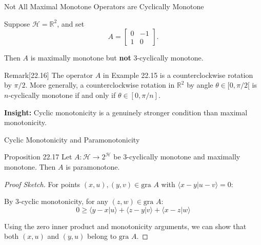 \documentclass[aspectratio=169,10pt]{beamer}
\begin{document}
\begin{frame}{Not All Maximal Monotone Operators are Cyclically Monotone}
    \begin{example}[22.15]
        Suppose $\mathcal{H} = \mathbb{R}^2$, and set
        $$A = \begin{bmatrix} 0 & -1 \\ 1 & 0 \end{bmatrix}.$$

        Then $A$ is maximally monotone but \textbf{not} 3-cyclically monotone.
    \end{example}

    \begin{block}{Remark}[22.16]
        The operator $A$ in Example 22.15 is a counterclockwise rotation by $\pi/2$.
        More generally, a counterclockwise rotation in $\mathbb{R}^2$ by angle $\theta \in [0, \pi/2[$
        is $n$-cyclically monotone if and only if $\theta \in [0, \pi/n]$.
    \end{block}

    \vspace{0.3cm}
    \textbf{Insight:} Cyclic monotonicity is a genuinely stronger condition than maximal monotonicity.
\end{frame}

\begin{frame}{Cyclic Monotonicity and Paramonotonicity}
    \begin{block}{Proposition 22.17}
        Let $A: \mathcal{H} \to 2^{\mathcal{H}}$ be 3-cyclically monotone and maximally monotone.
        Then $A$ is paramonotone.
    \end{block}

    \begin{proof}[Proof Sketch]
        For points $(x,u), (y,v) \in \text{gra } A$ with $\langle x - y | u - v \rangle = 0$:

        By 3-cyclic monotonicity, for any $(z, w) \in \text{gra } A$:
        $$0 \geq \langle y - x | u \rangle + \langle z - y | v \rangle + \langle x - z | w \rangle$$

        Using the zero inner product and monotonicity arguments, we can show that
        both $(x,u)$ and $(y,u)$ belong to $\text{gra } A$.
    \end{proof}
\end{frame}

\end{document}
